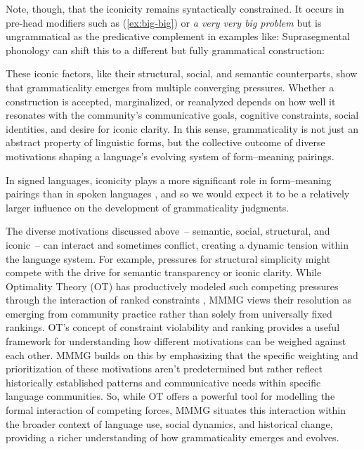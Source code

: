 \documentclass[12pt,letterpaper]{article}
\begin{document}
Note, though, that the iconicity remains syntactically constrained. It occurs in pre-head modifiers such as (\ref{ex:big-big}) or \textit{a very very big problem} \autocite{Watt1968, Fries1970} but is ungrammatical as the predicative complement \autocite[561--562]{Huddleston2002} in examples like:
\label{ex:big-big2}
\z
Suprasegmental phonology can shift this to a different but fully grammatical construction:
\label{ex:big-big3}
\z

These iconic factors, like their structural, social, and semantic counterparts, show that grammaticality emerges from multiple converging pressures. Whether a construction is accepted, marginalized, or reanalyzed depends on how well it resonates with the community’s communicative goals, cognitive constraints, social identities, and desire for iconic clarity. In this sense, grammaticality is not just an abstract property of linguistic forms, but the collective outcome of diverse motivations shaping a language’s evolving system of form--meaning pairings.

In signed languages, iconicity plays a more significant role in form--meaning pairings than in spoken languages \autocite{Frishberg1975,Quer2019}, and so we would expect it to be a relatively larger influence on the development of grammaticality judgments.

\bigskip

The diverse motivations discussed above~-- semantic, social, structural, and iconic~-- can interact and sometimes conflict, creating a dynamic tension within the language system. For example, pressures for structural simplicity might compete with the drive for semantic transparency or iconic clarity. While Optimality Theory (OT) has productively modeled such competing pressures through the interaction of ranked constraints \autocite{prince2004}, MMMG views their resolution as emerging from community practice rather than solely from universally fixed rankings. OT's concept of constraint violability and ranking provides a useful framework for understanding how different motivations can be weighed against each other. MMMG builds on this by emphasizing that the specific weighting and prioritization of these motivations aren't predetermined but rather reflect historically established patterns and communicative needs within specific language communities. So, while OT offers a powerful tool for modelling the formal interaction of competing forces, MMMG situates this interaction within the broader context of language use, social dynamics, and historical change, providing a richer understanding of how grammaticality emerges and evolves.
\end{document}
